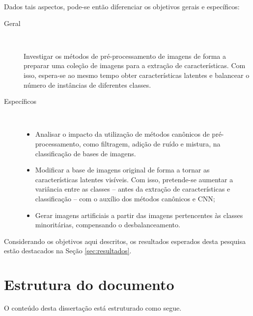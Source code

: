 Dados tais aspectos, pode-se então diferenciar os objetivos gerais e específicos:

\begin{description}
\item[Geral] \

Investigar os métodos de pré-processamento de imagens de forma a preparar uma coleção de imagens para a extração de características. Com isso, espera-se ao mesmo tempo obter características latentes e balancear o número de instâncias de diferentes classes.

\item[Específicos] \

  \begin{itemize}
      \item Analisar o impacto da utilização de métodos canônicos de pré-processamento, como filtragem, adição de ruído e mistura, na classificação de bases de imagens.


      \item Modificar a base de imagens original de forma a tornar as características latentes visíveis. Com isso, pretende-se aumentar a variância entre as classes -- antes da extração de características e classificação -- com o auxílio dos métodos canônicos e CNN;

      \item Gerar imagens artificiais a partir das imagens pertencentes às classes minoritárias, compensando o desbalanceamento.
  \end{itemize}
\end{description}

Considerando os objetivos aqui descritos, os resultados esperados desta pesquisa estão destacados na Seção \ref{sec:resultados}.

\section{Estrutura do documento}

O conteúdo desta dissertação está estruturado como segue.

